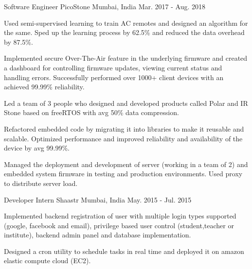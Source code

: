 \begin{cventries}
	\cventry
	{Software Engineer} %
	{PicoStone} %
	{Mumbai, India} %
	{Mar. 2017 - Aug. 2018} %
	{ \begin{cvitems} %
	\item{Used semi-supervised learning to train AC remotes and designed an algorithm for the same. Sped up the learning process by 62.5\% and reduced the data overhead by 87.5\%.} %
      \item {Implemented secure Over-The-Air feature in the underlying firmware and created a dashboard for controlling firmware updates, viewing current status and handling errors. Successfully performed over 1000+ client devices with an achieved 99.99\% reliability.}
      \item {Led a team of 3 people who designed and developed products called Polar and IR Stone based on freeRTOS with avg 50\% data compression.}  %
      \item {Refactored embedded code by migrating it into libraries to make it reusable and scalable. Optimized performance and improved reliability and availability of the device by avg 99.99\%.}  %
      \item {Managed the deployment and development of server (working in a team of 2) and embedded system firmware in testing and production environments. Used proxy to distribute server load.}
     \end{cvitems}
  }


	\cventry
	{Developer Intern} %
	{Shaastr } %
	{Mumbai, India} %
	{May. 2015 - Jul. 2015} %
	{
		\begin{cvitems} %
			\item {Implemented backend registration of user with multiple login types supported (google, facebook and email), privilege based user control (student,teacher or institute), backend admin panel and database implementation.}
			\item {Designed a cron utility to schedule tasks in real time and deployed it on amazon elastic compute cloud (EC2).}
		\end{cvitems}
	}

\end{cventries}
